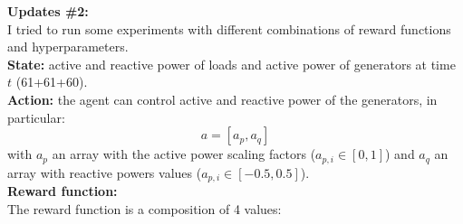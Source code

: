\noindent \textbf{Updates \#2: \label{rlupadate}}\\
I tried to run some experiments with different combinations of reward functions and hyperparameters. \\
\textbf{State:} active and reactive power of loads and active power of generators at time $t$ (61+61+60).\\

\textbf{Action:} the agent can control active and reactive power of the generators, in particular:
\[
a = [a_p, a_q]
\]
with $a_p$ an array with the active power scaling factors ($a_{p,i} \in [0,1]$) and $a_q$ an array with reactive powers values ($a_{p,i} \in [-0.5,0.5]$).\\

\textbf{Reward function:}\\
The reward function is a composition of 4 values:
